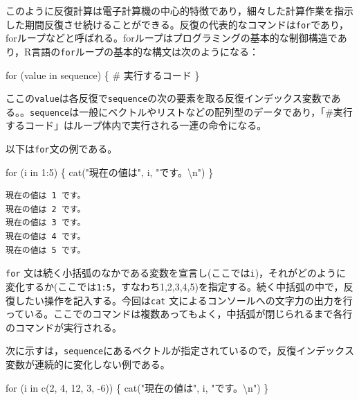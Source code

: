 \documentclass[
  a4paper,
]{ltjsbook}
\newenvironment{Shaded}{\begin{snugshade}}{\end{snugshade}}
\newcommand{\CommentTok}[1]{\textcolor[rgb]{0.37,0.37,0.37}{#1}}
\newcommand{\ControlFlowTok}[1]{\textcolor[rgb]{0.00,0.23,0.31}{#1}}
\newcommand{\DecValTok}[1]{\textcolor[rgb]{0.68,0.00,0.00}{#1}}
\newcommand{\FunctionTok}[1]{\textcolor[rgb]{0.28,0.35,0.67}{#1}}
\newcommand{\NormalTok}[1]{\textcolor[rgb]{0.00,0.23,0.31}{#1}}
\newcommand{\SpecialCharTok}[1]{\textcolor[rgb]{0.37,0.37,0.37}{#1}}
\newcommand{\StringTok}[1]{\textcolor[rgb]{0.13,0.47,0.30}{#1}}
\begin{document}
このように反復計算は電子計算機の中心的特徴であり，細々した計算作業を指示した期間反復させ続けることができる。反復の代表的なコマンドは\texttt{for}であり，forループなどと呼ばれる。forループはプログラミングの基本的な制御構造であり，R言語の\texttt{for}ループの基本的な構文は次のようになる：

\begin{Shaded}
\begin{Highlighting}[]
\ControlFlowTok{for}\NormalTok{ (value }\ControlFlowTok{in}\NormalTok{ sequence) \{}
    \CommentTok{\# 実行するコード}
\NormalTok{\}}
\end{Highlighting}
\end{Shaded}

ここの\texttt{value}は各反復で\texttt{sequence}の次の要素を取る反復インデックス変数である。。\texttt{sequence}は一般にベクトルやリストなどの配列型のデータであり，「\#実行するコード」はループ体内で実行される一連の命令になる。

以下は\texttt{for}文の例である。

\begin{Shaded}
\begin{Highlighting}[]
\ControlFlowTok{for}\NormalTok{ (i }\ControlFlowTok{in} \DecValTok{1}\SpecialCharTok{:}\DecValTok{5}\NormalTok{) \{}
  \FunctionTok{cat}\NormalTok{(}\StringTok{"現在の値は"}\NormalTok{, i, }\StringTok{"です。}\SpecialCharTok{\textbackslash{}n}\StringTok{"}\NormalTok{)}
\NormalTok{\}}
\end{Highlighting}
\end{Shaded}

\begin{verbatim}
現在の値は 1 です。
現在の値は 2 です。
現在の値は 3 です。
現在の値は 4 です。
現在の値は 5 です。
\end{verbatim}

\texttt{for}
文は続く小括弧のなかである変数を宣言し(ここでは\texttt{i})，それがどのように変化するか(ここでは\texttt{1:5}，すなわち1,2,3,4,5)を指定する。続く中括弧の中で，反復したい操作を記入する。今回は\texttt{cat}
文によるコンソールへの文字力の出力を行っている。ここでのコマンドは複数あってもよく，中括弧が閉じられるまで各行のコマンドが実行される。

次に示すは，\texttt{sequence}にあるベクトルが指定されているので，反復インデックス変数が連続的に変化しない例である。

\begin{Shaded}
\begin{Highlighting}[]
\ControlFlowTok{for}\NormalTok{ (i }\ControlFlowTok{in} \FunctionTok{c}\NormalTok{(}\DecValTok{2}\NormalTok{, }\DecValTok{4}\NormalTok{, }\DecValTok{12}\NormalTok{, }\DecValTok{3}\NormalTok{, }\SpecialCharTok{{-}}\DecValTok{6}\NormalTok{)) \{}
  \FunctionTok{cat}\NormalTok{(}\StringTok{"現在の値は"}\NormalTok{, i, }\StringTok{"です。}\SpecialCharTok{\textbackslash{}n}\StringTok{"}\NormalTok{)}
\NormalTok{\}}
\end{Highlighting}
\end{Shaded}
\end{document}
